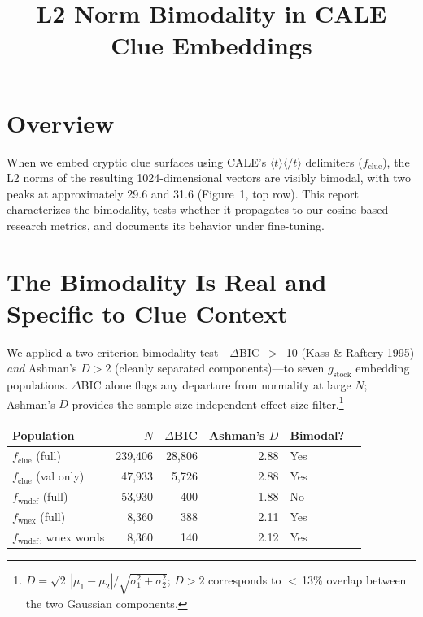 \documentclass[11pt]{article}
\title{L2 Norm Bimodality in CALE Clue Embeddings}
\author{}
\date{}
\begin{document}
\maketitle
\vspace{-4em}

\section*{Overview}

When we embed cryptic clue surfaces using CALE's $\langle t\rangle\langle/t\rangle$ delimiters
($f_\text{clue}$), the L2 norms of the resulting 1024-dimensional vectors are
visibly bimodal, with two peaks at approximately 29.6 and 31.6 (Figure~1,
top row). This report characterizes the bimodality, tests whether it
propagates to our cosine-based research metrics, and documents its behavior
under fine-tuning.

\section*{The Bimodality Is Real and Specific to Clue Context}

We applied a two-criterion bimodality test---$\Delta$BIC~$>$~10 (Kass \&
Raftery 1995) \emph{and} Ashman's $D > 2$ (cleanly separated
components)---to seven $g_\text{stock}$ embedding populations. $\Delta$BIC
alone flags any departure from normality at large $N$; Ashman's $D$ provides
the sample-size-independent effect-size filter.\footnote{$D =
\sqrt{2}\,|\mu_1 - \mu_2| / \sqrt{\sigma_1^2 + \sigma_2^2}$; $D > 2$
corresponds to $<$\,13\% overlap between the two Gaussian components.}

\begin{table}[h]
\centering
\begin{tabular}{lrrrll}
\toprule
Population & $N$ & $\Delta$BIC & Ashman's $D$ & Bimodal? \\
\midrule
$f_\text{clue}$ (full) & 239,406 & 28,806 & 2.88 & Yes \\
$f_\text{clue}$ (val only) & 47,933 & 5,726 & 2.88 & Yes \\
$f_\text{wndef}$ (full) & 53,930 & 400 & 1.88 & No \\
$f_\text{wnex}$ (full) & 8,360 & 388 & 2.11 & Yes \\
$f_\text{wndef}$, wnex words & 8,360 & 140 & 2.12 & Yes \\
\bottomrule
\end{tabular}
\end{table}
\end{document}
